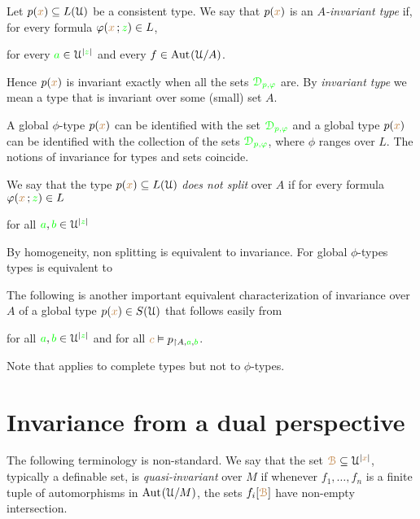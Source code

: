 \documentclass[creche.tex]{subfiles}
\begin{document}
Let $p({\color{brown} x})\subseteq L(\EuScript U)$ be a consistent type.
We say that $p({\color{brown} x})$ is an \emph{$A$-invariant type\/} if, for every formula $\varphi({\color{brown} x}\,;{\color{green} z})\in L$, 

\hfill for every ${\color{green} a}\in\EuScript U^{|{\color{green} z}|}$ and every $f\in{\rm Aut\kern.15ex}(\EuScript U/A)$.

Hence $p({\color{brown} x})$ is invariant exactly when all the sets $\color{green}\EuScript D_{p,\varphi}$ are. 
By \emph{invariant type\/} we mean a type that is invariant over some (small) set $A$.

A global $\phi$-type $p({\color{brown} x})$ can be identified with the set ${\color{green}\EuScript D_{p,\varphi}}$ and a global type $p({\color{brown} x})$ can be identified with the collection of the sets ${\color{green}\EuScript D_{p,\varphi}}$, where $\phi$ ranges over $L$.
The notions of invariance for types and sets coincide.

We say that the type $p({\color{brown} x})\subseteq L(\EuScript U)$ \emph{does not split\/} over $A$ if for every formula $\varphi({\color{brown} x}\,;{\color{green} z})\in L$

\hfill for all ${\color{green} a},{\color{green} b}\in\EuScript U^{|{\color{green} z}|}$

By homogeneity, non splitting is equivalent to invariance.
For global $\phi$-types types  is equivalent to


The following is another important equivalent characterization of invariance over $A$ of a global type $p({\color{brown} x})\in S(\EuScript U)$ that follows easily  from 

\hfill for all ${\color{green} a},{\color{green} b}\in\EuScript U^{|{\color{green} z}|}$ and for all ${\color{brown} c}\vDash p_{\restriction A,{\color{green} a},{\color{green} b}}$.

Note that  applies to complete types but not to $\phi$-types.

\section{Invariance from a dual perspective}

\noindent\llap{\textcolor{red}{\Large\warning}\kern1.5ex}The following terminology is non-standard.
We say that the set ${\color{brown}\EuScript B}\subseteq\EuScript U^{|{\color{brown} x}|}$, typically a definable set, is \emph{quasi-invariant\/} over $M$ if whenever $f_1,\dots,f_n$ is a finite tuple of automorphisms in ${\rm Aut\kern.15ex}(\EuScript U/M)$, the sets $f_i[{\color{brown}\EuScript B}]$ have non-empty intersection.
\end{document}
